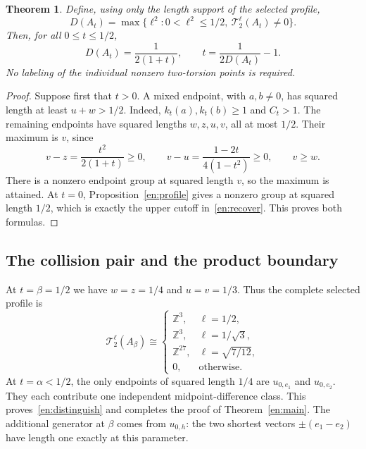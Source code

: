 \documentclass[12pt]{amsart}
\newcommand{\TheoremName}{Theorem}
\newtheorem{thm}{\TheoremName}[section]
\theoremstyle{definition}
\theoremstyle{remark}
\numberwithin{equation}{section}
\newcommand{\Z}{\mathbb{Z}}
\begin{document}
\begin{thm}\label{en:reconstruct}
Define, using only the length support of the selected profile,
\begin{equation}\label{en:recover}
D(A_t)=\max\{\ell^2:0<\ell^2\leq1/2,
\ \mathcal T_2^\ell(A_t)\ne0\}.
\end{equation}
Then, for all $0\leq t\leq1/2$,
\begin{equation}\label{en:recoverformula}
D(A_t)=\frac1{2(1+t)},\qquad
t=\frac1{2D(A_t)}-1.
\end{equation}
No labeling of the individual nonzero two-torsion points is required.
\end{thm}
\begin{proof}
Suppose first that $t>0$. A mixed endpoint, with $a,b\ne0$, has squared length at least $u+w>1/2$. Indeed, $k_t(a),k_t(b)\geq1$ and $C_t>1$. The remaining endpoints have squared lengths $w,z,u,v$, all at most $1/2$. Their maximum is $v$, since
\[
v-z=\frac{t^2}{2(1+t)}\geq0,\qquad
v-u=\frac{1-2t}{4(1-t^2)}\geq0,\qquad v\geq w.
\]
There is a nonzero endpoint group at squared length $v$, so the maximum is attained. At $t=0$, Proposition~\ref{en:profile} gives a nonzero group at squared length $1/2$, which is exactly the upper cutoff in~\eqref{en:recover}. This proves both formulas.
\end{proof}

\subsection{The collision pair and the product boundary}
At $t=\beta=1/2$ we have $w=z=1/4$ and $u=v=1/3$. Thus the complete selected profile is
\begin{equation}\label{en:betaprofile}
\mathcal T_2^\ell(A_\beta)\cong
\begin{cases}
\Z^3,&\ell=1/2,\\
\Z^3,&\ell=1/\sqrt3,\\
\Z^{27},&\ell=\sqrt{7/12},\\
0,&\text{otherwise}.
\end{cases}
\end{equation}
At $t=\alpha<1/2$, the only endpoints of squared length $1/4$ are $u_{0,e_1}$ and $u_{0,e_2}$. They each contribute one independent midpoint-difference class. This proves~\eqref{en:distinguish} and completes the proof of Theorem~\ref{en:main}. The additional generator at $\beta$ comes from $u_{0,h}$: the two shortest vectors $\pm(e_1-e_2)$ have length one exactly at this parameter.
\end{document}
